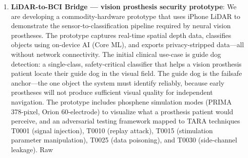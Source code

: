 \begin{enumerate}
        motor imagery and epilepsy datasets, ODC-BY; and UCI alcoholism data,
        CC~BY~4.0) alongside synthetic data generated through BrainFlow and
        custom attack simulators. All datasets are tagged with provenance,
        licensing, condition metadata, and DSM-5-TR diagnostic category references
        in a KQL-queryable data lake. This pipeline enables validation of QIF
        components (Spectrum/Signal Analyzer, Neurowall, threat detection) against
        both normal and attack-scenario EEG signals. A potential research direction
        is using spectral analysis of condition-tagged datasets to produce
        pattern-match confidence scores---statistical similarity measures against
        reference distributions---that could complement behavioral assessment for
        conditions such as ADHD and autism spectrum disorder, where diagnostic
        overlap and behavioral masking (camouflaging) present challenges for
        traditional assessment instruments (Hull et~al.\ 2017, Lai et~al.\ 2017).
        This requires independent clinical validation, larger and more diverse
        datasets, and formal sensitivity/specificity analysis before any clinical
        application. Documentation: \url{https://github.com/qinnovates/qinnovate/blob/main/shared/EEG-DATA-PIPELINE.md}
  \item \textbf{LiDAR-to-BCI Bridge --- vision prosthesis security prototype}:
        We are developing a commodity-hardware prototype that uses iPhone LiDAR to
        demonstrate the sensor-to-classification pipeline required by neural vision
        prostheses. The prototype captures real-time spatial depth data, classifies
        objects using on-device AI (Core ML), and exports privacy-stripped data---all
        without network connectivity. The initial clinical use-case is guide dog
        detection: a single-class, safety-critical classifier that helps a vision
        prosthesis patient locate their guide dog in the visual field. The guide dog
        is the failsafe anchor---the one object the system must identify reliably,
        because early prostheses will not produce sufficient visual quality for
        independent navigation. The prototype includes phosphene simulation modes
        (PRIMA 378-pixel, Orion 60-electrode) to visualize what a prosthesis patient
        would perceive, and an adversarial testing framework mapped to TARA techniques
        T0001 (signal injection), T0010 (replay attack), T0015 (stimulation parameter
        manipulation), T0025 (data poisoning), and T0030 (side-channel leakage). Raw

\end{enumerate}
